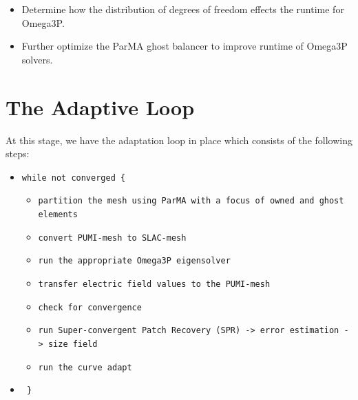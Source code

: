\documentclass[review,12pt]{elsarticle_summary_report}
\begin{document}
\begin{itemize}
  \item Determine how the distribution of degrees of freedom effects the runtime for Omega3P.
  \item Further optimize the ParMA ghost balancer to improve runtime of Omega3P solvers.
\end{itemize}


\clearpage
\newpage

\section{\label{adaptive_loop}The Adaptive Loop}
At this stage, we have the adaptation loop in place which consists of the following steps:

\begin{itemize}
  \item[] \texttt{while not converged \{ }
   \begin{itemize}
     \item \texttt{partition the mesh using ParMA with a focus of owned and ghost elements}
     \item \texttt{convert PUMI-mesh to SLAC-mesh}
     \item \texttt{run the appropriate Omega3P eigensolver}
     \item \texttt{transfer electric field values to the PUMI-mesh}
     \item \texttt{check for convergence}
     \item \texttt{run Super-convergent Patch Recovery (SPR) -> error estimation -> size field}
     \item \texttt{run the curve adapt} %
   \end{itemize}

 \item[] \texttt{  \} }
\end{itemize}
\end{document}
